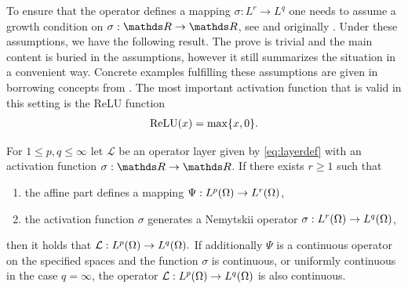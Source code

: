 To ensure that the \Nem{} operator defines a mapping $\sigma:L^r\to L^q$ one needs to assume a growth condition on $\sigma:\R\to\R$, see \cite[Eq. 4]{kabri2023resolution} and originally \cite{tröltzsch}. Under these assumptions, we have the following result. The prove is trivial and the main content is buried in the assumptions, however it still summarizes the situation in a convenient way. Concrete examples fulfilling these assumptions are given in \cite{kabri2023resolution} borrowing concepts from \cite{ambrosetti, tröltzsch}. The most important activation function that is valid in this setting is the ReLU function
%
\begin{align*}
\operatorname{ReLU}(x) = \max\{x, 0\}.
\end{align*}
%
%
\begin{proposition}{\cite[Prop. 1]{kabri2023resolution}}{}
	For $1 \leq p, q \leq \infty$ let $\mathcal{L}$ be an operator layer given by \eqref{eq:layerdef} with an activation function $\sigma: \R \rightarrow \R$.
	If there exists $r \geq 1$ such that
	\begin{enumerate}[label=(\roman*)]
		\item the affine part defines a mapping $\Psi: L^p(\Omega) \rightarrow L^r(\Omega)$,
		\item the activation function $\sigma$ generates a Nemytskii operator $\sigma: L^r(\Omega) \rightarrow L^q(\Omega)$,
	\end{enumerate}
	then it holds that
	$
	\mathcal{L}: L^p(\Omega) \rightarrow L^q(\Omega).
	$
	If additionally $\Psi$ is a continuous operator on the specified spaces and the function $\sigma$ is continuous, or uniformly continuous in the case $q=\infty$, the operator $\mathcal{L}: L^p(\Omega) \rightarrow L^q(\Omega)$ is also continuous.
\end{proposition}
%
%
